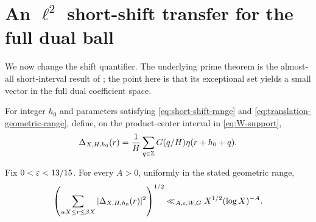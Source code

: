 \section{An \texorpdfstring{$\ell^2$}{l2} short-shift transfer for the full dual ball}
\label{sec:l2-transfer}

We now change the shift quantifier.  The underlying prime theorem is the
almost-all short-interval result of \citet{GuthMaynard2026}; the point here
is that its exceptional set yields a small vector in the full dual
coefficient space.

For integer $h_0$ and parameters satisfying
\eqref{eq:short-shift-range} and
\eqref{eq:translation-geometric-range}, define, on the product-center
interval in \eqref{eq:W-support},
\begin{equation}
 \Delta_{X,H,h_0}(r)=
 \frac1H\sum_{q\in\mathbb Z}G(q/H)\eta(r+h_0+q).
 \label{eq:translated-residual-vector}
\end{equation}

\begin{theorem}
\label{thm:translated-residual-l2}
Fix $0<\varepsilon<13/15$.  For every $A>0$, uniformly in the stated geometric
range,
\begin{equation}
 \left(
 \sum_{\alpha X\leq r\leq\beta X}
 |\Delta_{X,H,h_0}(r)|^2
 \right)^{1/2}
 \ll_{A,\varepsilon,W,G}X^{1/2}(\log X)^{-A}.
 \label{eq:translated-residual-l2}
\end{equation}
\end{theorem}

